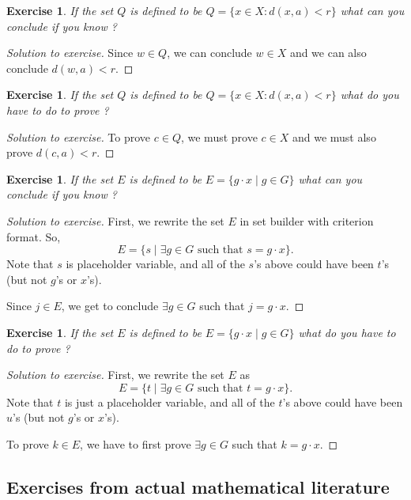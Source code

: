 \documentclass{book}
\newcounter{ekcounter}%
\theoremstyle{ekimcustom}
\newtheorem{exercise}[ekcounter]{Exercise}
\begin{document}
\begin{exercise}
If the set $Q$ is defined to be $Q=\{x \in X : d(x,a)<r\}$ what can you conclude if you know ?
\end{exercise}
\begin{proof}[Solution to exercise]
Since $w \in Q$, we can conclude $w \in X$ and we can also conclude $d(w,a)<r$.
\end{proof}

\begin{exercise}
If the set $Q$ is defined to be $Q=\{x \in X : d(x,a)<r\}$ what do you have to do to prove ?
\end{exercise}
\begin{proof}[Solution to exercise]
To prove $c \in Q$, we must prove $c \in X$ and we must also prove $d(c,a)<r$.
\end{proof}

\begin{exercise}
If the set $E$ is defined to be $E=\{g \cdot x \mid g \in G\}$ what can you conclude if you know ?
\end{exercise}
\begin{proof}[Solution to exercise]
First, we rewrite the set $E$ in set builder with criterion format. So,
\[E = \{s \mid \exists g \in G \text{ such that } s=g \cdot x\}.\]
Note that $s$ is placeholder variable, and all of the $s$'s above could have been $t$'s (but not $g$'s or $x$'s).

Since $j \in E$, we get to conclude $\exists g \in G$ such that $j = g \cdot x$.
\end{proof}

\begin{exercise}
If the set $E$ is defined to be $E=\{g \cdot x \mid g \in G\}$ what do you have to do to prove ?
\end{exercise}
\begin{proof}[Solution to exercise]
First, we rewrite the set $E$ as
\[E = \{t \mid \exists g \in G \text{ such that } t=g \cdot x\}.\]
Note that $t$ is just a placeholder variable, and all of the $t$'s above could have been $u$'s (but not $g$'s or $x$'s).

To prove $k \in E$, we have to first prove $\exists g \in G$ such that $k = g \cdot x$.
\end{proof}



\subsection*{Exercises from actual mathematical literature}
\end{document}

